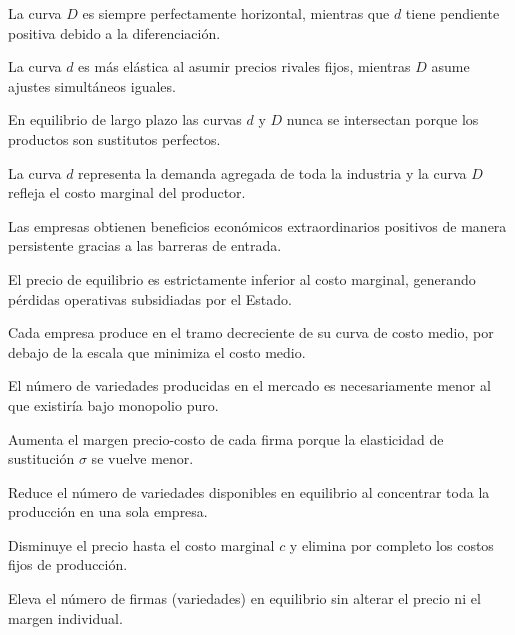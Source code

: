 \begin{opts}
    \item La curva $D$ es siempre perfectamente horizontal, mientras que $d$ tiene pendiente positiva debido a la diferenciación.
    \item La curva $d$ es más elástica al asumir precios rivales fijos, mientras $D$ asume ajustes simultáneos iguales.
    \item En equilibrio de largo plazo las curvas $d$ y $D$ nunca se intersectan porque los productos son sustitutos perfectos.
    \item La curva $d$ representa la demanda agregada de toda la industria y la curva $D$ refleja el costo marginal del productor.
\end{opts}

\begin{opts}
    \item Las empresas obtienen beneficios económicos extraordinarios positivos de manera persistente gracias a las barreras de entrada.
    \item El precio de equilibrio es estrictamente inferior al costo marginal, generando pérdidas operativas subsidiadas por el Estado.
    \item Cada empresa produce en el tramo decreciente de su curva de costo medio, por debajo de la escala que minimiza el costo medio.
    \item El número de variedades producidas en el mercado es necesariamente menor al que existiría bajo monopolio puro.
\end{opts}

\begin{opts}
    \item Aumenta el margen precio-costo de cada firma porque la elasticidad de sustitución $\sigma$ se vuelve menor.
    \item Reduce el número de variedades disponibles en equilibrio al concentrar toda la producción en una sola empresa.
    \item Disminuye el precio hasta el costo marginal $c$ y elimina por completo los costos fijos de producción.
    \item Eleva el número de firmas (variedades) en equilibrio sin alterar el precio ni el margen individual.
\end{opts}

